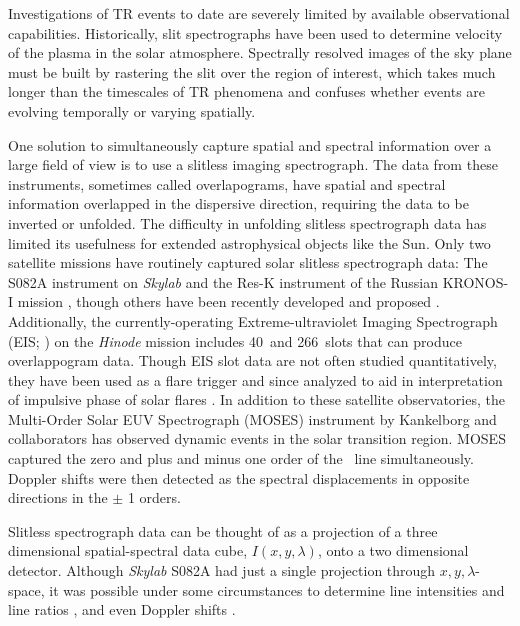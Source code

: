     
    Investigations of TR events to date are severely limited by available observational capabilities. 
    Historically, slit spectrographs have been used to determine velocity of the plasma in the solar atmosphere.   
    Spectrally resolved images of the sky plane must be built by rastering the slit over the region of interest, which takes much longer than the timescales of TR phenomena and confuses whether events are evolving temporally or varying spatially.  
    
    One solution to simultaneously capture spatial and spectral information over a large field of view is to use a slitless imaging spectrograph.  
    The data from these instruments, sometimes called overlapograms, have spatial and spectral information overlapped in the dispersive direction, requiring the data to be inverted or unfolded.
    The difficulty in unfolding slitless spectrograph data has limited its usefulness for extended astrophysical objects like the Sun. 
    Only two satellite missions have routinely captured solar slitless spectrograph data: The S082A instrument on {\it Skylab} \citep{Tousey1973} and the Res-K instrument of the Russian KRONOS-I mission \citep{Zhitnik1998}, though others have been recently developed and proposed \citep{winebarger2019,golub2020}. 
    Additionally, the currently-operating Extreme-ultraviolet Imaging Spectrograph (EIS; \citet{culhane2007}) on the {\it Hinode} mission \citep{kosugi2007} includes 40\arcsec\ and 266\arcsec\ slots that can produce overlappogram data.
    Though EIS slot data are not often studied quantitatively, they have been used as a flare trigger and since analyzed to aid in interpretation of impulsive phase of solar flares \citep{harra2017,harra2020}.
    In addition to these satellite observatories,  the Multi-Order Solar EUV Spectrograph (MOSES) instrument by Kankelborg and collaborators \citep{Kankelborg01,Fox2010,Rust2019} has observed dynamic events in the solar transition region.
    MOSES captured the zero and plus and minus one order of the \heii \ line simultaneously. 
    Doppler shifts were then detected as the spectral displacements in opposite directions in the $\pm$ 1 orders.
    
    Slitless spectrograph data can be thought of as a projection of a three dimensional spatial-spectral data cube, $I(x,y,\lambda)$, onto a two dimensional detector.  
    Although {\it Skylab} S082A had just a single projection through $x,y,\lambda$-space, it was possible under some circumstances to determine line intensities and line ratios \cite[e.g.,][]{Keenan1988, Tayal1989, Keenan2006}, and even Doppler shifts \citep{MariskaDoppler1992}. 

